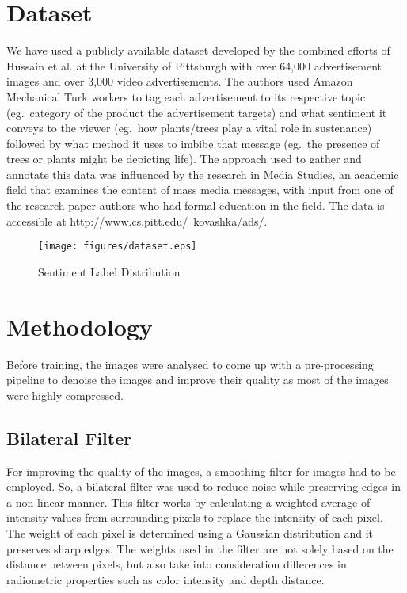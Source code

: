 \documentclass[conference]{IEEEtran}
\begin{document}
\section{Dataset} \label{sec:dataset}

We have used a publicly available dataset developed by the combined efforts of 
Hussain et al. at the University of Pittsburgh with over 64,000 advertisement images 
and over 3,000 video advertisements. The authors used Amazon Mechanical Turk workers
 to tag each advertisement to its respective topic (eg.\ category of the product  
 the advertisement targets) and what sentiment it conveys to the viewer (eg.\ how plants/trees 
play a vital role in sustenance) followed by what method it uses to imbibe that 
message (eg.\ the presence of trees or plants might be depicting life). The approach 
used to gather and annotate this data was influenced by the research in Media Studies, 
an academic field that examines the content of mass media messages, with input from 
one of the research paper authors\cite{b11} who had formal education in the 
field. The data is accessible at http://www.cs.pitt.edu/~kovashka/ads/.


\begin{figure}[htbp]
\texttt{[image: figures/dataset.eps]}
\caption{Sentiment Label Distribution}
\label{fig:dataset}
\end{figure}

\section{Methodology} \label{sec:prop_method}

Before training, the images were analysed to come up with a pre-processing pipeline 
to denoise the images and improve their quality as most of the images were highly 
compressed.

\subsection{Bilateral Filter}
For improving the quality of the images, a smoothing filter for images had to be 
employed. So, a bilateral filter was used to reduce noise while preserving edges 
in a non-linear manner. This filter works by calculating a weighted average of 
intensity values from surrounding pixels to replace the intensity of each pixel. 
The weight of each pixel is determined using a Gaussian distribution and it preserves 
sharp edges. The weights used in the filter are not solely based on the distance 
between pixels, but also take into consideration differences in radiometric properties 
such as color intensity and depth distance\cite{b15}.
\end{document}
